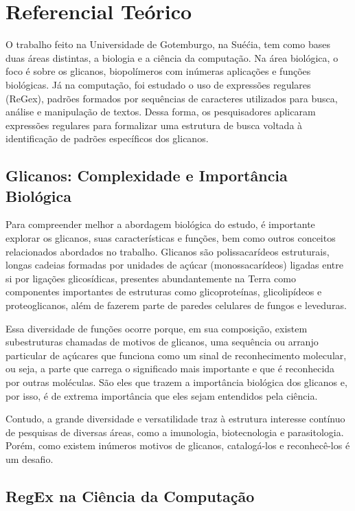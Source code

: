 \chapter{Referencial Teórico}

O trabalho feito na Universidade de Gotemburgo, na Suéćia, tem como bases duas áreas distintas, a biologia e a ciência da computação. Na área biológica, o foco é sobre os glicanos, biopolímeros com inúmeras aplicações e funções biológicas. Já na computação, foi estudado o uso de expressões regulares (ReGex), padrões formados por sequências de caracteres utilizados para busca, análise e manipulação de textos. Dessa forma, os pesquisadores aplicaram expressões regulares para formalizar uma estrutura de busca voltada à identificação de padrões específicos dos glicanos.

\section{Glicanos: Complexidade e Importância Biológica}

Para compreender melhor a abordagem biológica do estudo, é importante explorar os glicanos, suas características e funções, bem como outros conceitos relacionados abordados no trabalho. Glicanos são polissacarídeos estruturais, longas cadeias formadas por unidades de açúcar (monossacarídeos) ligadas entre si por ligações glicosídicas, presentes abundantemente na Terra como componentes importantes de estruturas como glicoproteínas, glicolipídeos e proteoglicanos, além de fazerem parte de paredes celulares de fungos e leveduras.

Essa diversidade de funções ocorre porque, em sua composição, existem subestruturas chamadas de motivos de glicanos, uma sequência ou arranjo particular de açúcares que funciona como um sinal de reconhecimento molecular, ou seja, a parte que carrega o significado mais importante e que é reconhecida por outras moléculas. São eles que trazem a importância biológica dos glicanos e, por isso, é de extrema importância que eles sejam entendidos pela ciência. 

Contudo, a grande diversidade e versatilidade traz à estrutura interesse contínuo de pesquisas de diversas áreas, como a imunologia, biotecnologia e parasitologia. Porém, como existem inúmeros motivos de glicanos, catalogá-los e reconhecê-los é um desafio.

\section{RegEx na Ciência da Computação}

